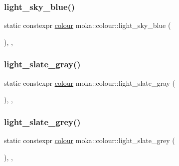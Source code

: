\mbox{\label{classmoka_1_1colour_a98d46f4acb076b3c8631de7ed28cd9ff}} 
\subsubsection{\texorpdfstring{light\_sky\_blue()}{light\_sky\_blue()}}
{\footnotesize\ttfamily static constexpr \mbox{\hyperlink{classmoka_1_1colour}{colour}} moka\+::colour\+::light\+\_\+sky\+\_\+blue (\begin{DoxyParamCaption}{ }\end{DoxyParamCaption})\hspace{0.3cm}{\ttfamily [inline]}, {\ttfamily [static]}, {\ttfamily [noexcept]}}

\mbox{\label{classmoka_1_1colour_a4411364de773b18b5f7be4e0c493d815}} 
\subsubsection{\texorpdfstring{light\_slate\_gray()}{light\_slate\_gray()}}
{\footnotesize\ttfamily static constexpr \mbox{\hyperlink{classmoka_1_1colour}{colour}} moka\+::colour\+::light\+\_\+slate\+\_\+gray (\begin{DoxyParamCaption}{ }\end{DoxyParamCaption})\hspace{0.3cm}{\ttfamily [inline]}, {\ttfamily [static]}, {\ttfamily [noexcept]}}

\mbox{\label{classmoka_1_1colour_ac1cbcc5b6e956fbfbeca6a625430c40e}} 
\subsubsection{\texorpdfstring{light\_slate\_grey()}{light\_slate\_grey()}}
{\footnotesize\ttfamily static constexpr \mbox{\hyperlink{classmoka_1_1colour}{colour}} moka\+::colour\+::light\+\_\+slate\+\_\+grey (\begin{DoxyParamCaption}{ }\end{DoxyParamCaption})\hspace{0.3cm}{\ttfamily [inline]}, {\ttfamily [static]}, {\ttfamily [noexcept]}}


